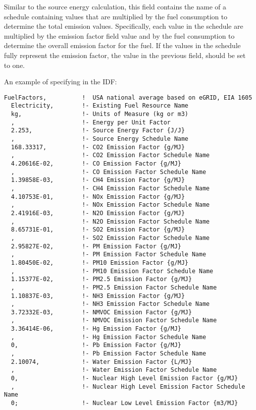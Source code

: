 Similar to the source energy calculation, this field contains the name of a schedule containing values that are multiplied by the fuel consumption to determine the total emission values. Specifically, each value in the schedule are multiplied by the emission factor field value and by the fuel consumption to determine the overall emission factor for the fuel. If the values in the schedule fully represent the emission factor, the value in the previous field, should be set to one.

An example of specifying in the IDF:

\begin{lstlisting}
FuelFactors,          !  USA national average based on eGRID, EIA 1605
  Electricity,        !- Existing Fuel Resource Name
  kg,                 !- Units of Measure (kg or m3)
  ,                   !- Energy per Unit Factor
  2.253,              !- Source Energy Factor {J/J}
  ,                   !- Source Energy Schedule Name
  168.33317,          !- CO2 Emission Factor {g/MJ}
  ,                   !- CO2 Emission Factor Schedule Name
  4.20616E-02,        !- CO Emission Factor {g/MJ}
  ,                   !- CO Emission Factor Schedule Name
  1.39858E-03,        !- CH4 Emission Factor {g/MJ}
  ,                   !- CH4 Emission Factor Schedule Name
  4.10753E-01,        !- NOx Emission Factor {g/MJ}
  ,                   !- NOx Emission Factor Schedule Name
  2.41916E-03,        !- N2O Emission Factor {g/MJ}
  ,                   !- N2O Emission Factor Schedule Name
  8.65731E-01,        !- SO2 Emission Factor {g/MJ}
  ,                   !- SO2 Emission Factor Schedule Name
  2.95827E-02,        !- PM Emission Factor {g/MJ}
  ,                   !- PM Emission Factor Schedule Name
  1.80450E-02,        !- PM10 Emission Factor {g/MJ}
  ,                   !- PM10 Emission Factor Schedule Name
  1.15377E-02,        !- PM2.5 Emission Factor {g/MJ}
  ,                   !- PM2.5 Emission Factor Schedule Name
  1.10837E-03,        !- NH3 Emission Factor {g/MJ}
  ,                   !- NH3 Emission Factor Schedule Name
  3.72332E-03,        !- NMVOC Emission Factor {g/MJ}
  ,                   !- NMVOC Emission Factor Schedule Name
  3.36414E-06,        !- Hg Emission Factor {g/MJ}
  ,                   !- Hg Emission Factor Schedule Name
  0,                  !- Pb Emission Factor {g/MJ}
  ,                   !- Pb Emission Factor Schedule Name
  2.10074,            !- Water Emission Factor {L/MJ}
  ,                   !- Water Emission Factor Schedule Name
  0,                  !- Nuclear High Level Emission Factor {g/MJ}
  ,                   !- Nuclear High Level Emission Factor Schedule Name
  0;                  !- Nuclear Low Level Emission Factor {m3/MJ}
\end{lstlisting}

